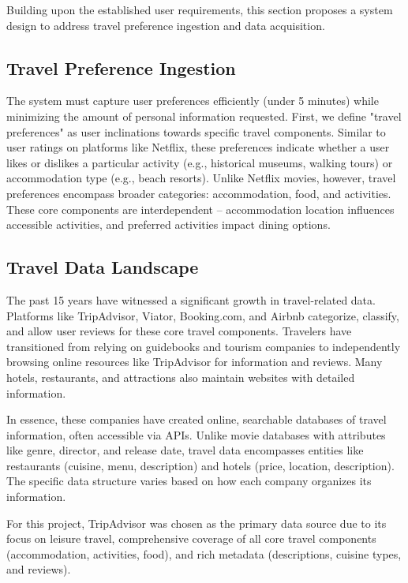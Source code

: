 \documentclass[12pt,a4paper]{report}
\begin{document}
Building upon the established user requirements, this section proposes a system design to address travel preference ingestion and data acquisition.

\subsection{Travel Preference Ingestion}

The system must capture user preferences efficiently (under 5 minutes) while minimizing the amount of personal information requested.  First, we define "travel preferences" as user inclinations towards specific travel components. Similar to user ratings on platforms like Netflix, these preferences indicate whether a user likes or dislikes a particular activity (e.g., historical museums, walking tours) or accommodation type (e.g., beach resorts).  Unlike Netflix movies, however, travel preferences encompass broader categories: accommodation, food, and activities. These core components are interdependent – accommodation location influences accessible activities, and preferred activities impact dining options.

\subsection{Travel Data Landscape}

The past 15 years have witnessed a significant growth in travel-related data. Platforms like TripAdvisor, Viator, Booking.com, and Airbnb categorize, classify, and allow user reviews for these core travel components.  Travelers have transitioned from relying on guidebooks and tourism companies to independently browsing online resources like TripAdvisor for information and reviews.  Many hotels, restaurants, and attractions also maintain websites with detailed information.

In essence, these companies have created online, searchable databases of travel information, often accessible via APIs. Unlike movie databases with attributes like genre, director, and release date, travel data encompasses entities like restaurants (cuisine, menu, description) and hotels (price, location, description).  The specific data structure varies based on how each company organizes its information.

For this project, TripAdvisor was chosen as the primary data source due to its focus on leisure travel, comprehensive coverage of all core travel components (accommodation, activities, food), and rich metadata (descriptions, cuisine types, and reviews).
\end{document}
